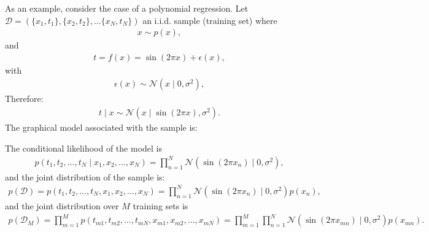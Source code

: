 \documentclass{tufte-handout}
\begin{document}
As an example, consider the case of a polynomial regression. Let $\mathcal D = (\{x_1,t_1\},\{x_2,t_2\}, \dots \{x_N,t_N\})$  an i.i.d. sample (training set)  where
\begin{align*}
x \sim p(x),
\end{align*}
and 
\begin{align*}
t= f(x)  = \sin(2\pi x) + \epsilon(x),
\end{align*}
with
\begin{align*}
  \epsilon(x) \sim \mathcal N (x\mid 0,\sigma^2) ,
\end{align*}
Therefore:
\begin{align*}
t \mid x \sim \mathcal N (x \mid \sin(2\pi x),\sigma^2).
\end{align*}
The graphical model associated with the sample is:
\begin{center}
\end{center}

The conditional  likelihood of the model is
\begin{align*}
p(t_1,t_2,\dots,t_N\mid  x_1,x_2,\dots,x_N) = \prod_{n=1}^N \mathcal N (\sin(2\pi x_n)\mid 0,\sigma^2),
\end{align*}
and the joint distribution of the sample  is:
\begin{align*}
p(\mathcal D) = p(t_1,t_2,\dots,t_N, x_1,x_2,\dots,x_N) = \prod_{n=1}^N \mathcal N (\sin(2\pi x_n)\mid 0,\sigma^2)p(x_n),
\end{align*}
and the joint distribution over $M$ training sets is
\begin{align*}
p(\mathcal D_M) = \prod_{m=1}^Mp(t_{m1},t_{m2},\dots,t_{mN}, x_{m1},x_{m2},\dots,x_{mN}) = \prod_{m=1}^M\prod_{n=1}^N \mathcal N (\sin(2\pi x_{mn})\mid 0, \sigma^2) p(x_{mn}).
\end{align*}
\end{document}
